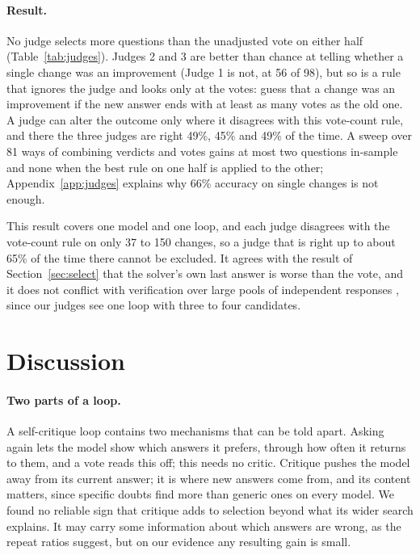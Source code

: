 \documentclass[11pt]{article}
\begin{document}
\paragraph{Result.}
No judge selects more questions than the unadjusted vote on either half (Table~\ref{tab:judges}).
Judges 2 and 3 are better than chance at telling whether a single change was an improvement (Judge 1 is not, at 56 of 98), but so is a rule that ignores the judge and looks only at the votes: guess that a change was an improvement if the new answer ends with at least as many votes as the old one.
A judge can alter the outcome only where it disagrees with this vote-count rule, and there the three judges are right 49\%, 45\% and 49\% of the time.
A sweep over 81 ways of combining verdicts and votes gains at most two questions in-sample and none when the best rule on one half is applied to the other; Appendix~\ref{app:judges} explains why 66\% accuracy on single changes is not enough.

This result covers one model and one loop, and each judge disagrees with the vote-count rule on only 37 to 150 changes, so a judge that is right up to about 65\% of the time there cannot be excluded.
It agrees with the result of Section~\ref{sec:select} that the solver's own last answer is worse than the vote, and it does not conflict with verification over large pools of independent responses \citep{zhao2025sample}, since our judges see one loop with three to four candidates.

\section{Discussion}

\paragraph{Two parts of a loop.}
A self-critique loop contains two mechanisms that can be told apart.
Asking again lets the model show which answers it prefers, through how often it returns to them, and a vote reads this off; this needs no critic.
Critique pushes the model away from its current answer; it is where new answers come from, and its content matters, since specific doubts find more than generic ones on every model.
We found no reliable sign that critique adds to selection beyond what its wider search explains.
It may carry some information about which answers are wrong, as the repeat ratios suggest, but on our evidence any resulting gain is small.
\end{document}
